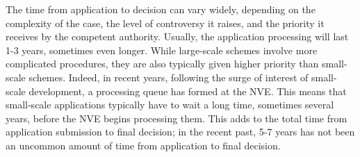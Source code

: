 The time from application to decision can vary widely, depending on the complexity of the case, the level of controversy it raises, and the priority it receives by the competent authority. Usually, the application processing will last 1-3 years, sometimes even longer. While large-scale schemes involve more complicated procedures, they are also typically given higher priority than small-scale schemes. Indeed, in recent years, following the surge of interest of small-scale development, a processing queue has formed at the NVE. This means that small-scale applications typically have to wait a long time, sometimes several years, before the NVE begins processing them. This adds to the total time from application submission to final decision; in the recent past, 5-7 years has not been an uncommon amount of time from application to 
final decision.

